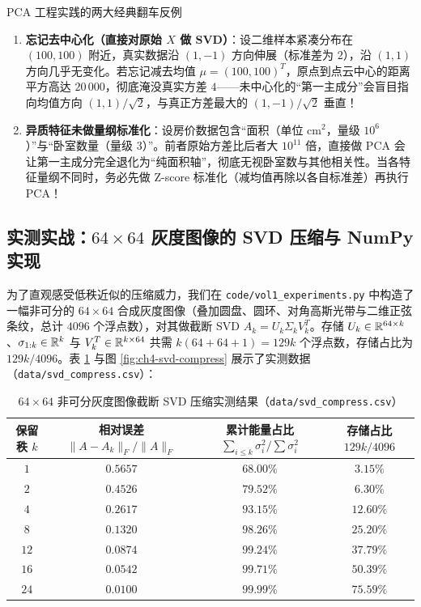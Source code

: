 \begin{failBox}{PCA 工程实践的两大经典翻车反例}
\begin{enumerate}
  \item \textbf{忘记去中心化（直接对原始 $X$ 做 SVD）}：设二维样本紧凑分布在 $(100, 100)$ 附近，真实数据沿 $(1, -1)$ 方向伸展（标准差为 $2$），沿 $(1,1)$ 方向几乎无变化。若忘记减去均值 $\mu = (100,100)^T$，原点到点云中心的距离平方高达 $20\,000$，彻底淹没真实方差 $4$——未中心化的“第一主成分”会盲目指向均值方向 $(1,1)/\sqrt{2}$，与真正方差最大的 $(1,-1)/\sqrt{2}$ 垂直！
  \item \textbf{异质特征未做量纲标准化}：设房价数据包含“面积（单位 $\mathrm{cm}^2$，量级 $10^6$）”与“卧室数量（量级 $3$）”。前者原始方差比后者大 $10^{11}$ 倍，直接做 PCA 会让第一主成分完全退化为“纯面积轴”，彻底无视卧室数与其他相关性。当各特征量纲不同时，务必先做 Z-score 标准化（减均值再除以各自标准差）再执行 PCA！
\end{enumerate}
\end{failBox}

\subsection{实测实战：$64\times 64$ 灰度图像的 SVD 压缩与 NumPy 实现}

为了直观感受低秩近似的压缩威力，我们在 \texttt{code/vol1\_experiments.py} 中构造了一幅非可分的 $64\times 64$ 合成灰度图像（叠加圆盘、圆环、对角高斯光带与二维正弦条纹，总计 $4096$ 个浮点数），对其做截断 SVD $A_k = U_k \Sigma_k V_k^T$。存储 $U_k \in \mathbb{R}^{64\times k}$、$\sigma_{1:k} \in \mathbb{R}^k$ 与 $V_k^T \in \mathbb{R}^{k\times 64}$ 共需 $k(64 + 64 + 1) = 129k$ 个浮点数，存储占比为 $129k / 4096$。表 \ref{tab:ch4-svd-compress} 与图 \ref{fig:ch4-svd-compress} 展示了实测数据（\texttt{data/svd\_compress.csv}）：

\begin{table}[htbp]
  \centering
  \caption{$64\times 64$ 非可分灰度图像截断 SVD 压缩实测结果（\texttt{data/svd\_compress.csv}）}
  \label{tab:ch4-svd-compress}
  \small
  \begin{tabular}{@{}cccc@{}}
    \toprule
    \textbf{保留秩 $k$} & \textbf{相对误差 $\|A-A_k\|_F/\|A\|_F$} & \textbf{累计能量占比 $\sum_{i\le k}\sigma_i^2/\sum\sigma_i^2$} & \textbf{存储占比 $129k/4096$} \\
    \midrule
    $1$  & $0.5657$ & $68.00\%$ & $3.15\%$ \\
    $2$  & $0.4526$ & $79.52\%$ & $6.30\%$ \\
    $4$  & $0.2617$ & $\mathbf{93.15\%}$ & $\mathbf{12.60\%}$ \\
    $8$  & $0.1320$ & $\mathbf{98.26\%}$ & $\mathbf{25.20\%}$ \\
    $12$ & $0.0874$ & $99.24\%$ & $37.79\%$ \\
    $16$ & $0.0542$ & $\mathbf{99.71\%}$ & $50.39\%$ \\
    $24$ & $0.0100$ & $99.99\%$ & $75.59\%$ \\
    \bottomrule
  \end{tabular}
\end{table}

